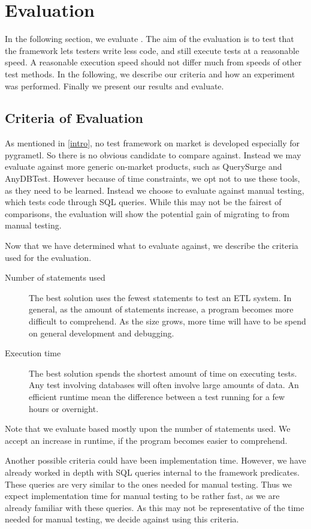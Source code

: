\section{Evaluation}\label{sect:eval}
In the following section, we evaluate \FW{}. The aim of the evaluation is to test that the framework lets testers write less code, and still execute tests at a reasonable speed. A reasonable execution speed should not differ much from speeds of other test methods.   In the following, we describe our criteria and how an experiment was performed. Finally we present our results and evaluate. 

\subsection{Criteria of Evaluation}\label{subsect:CoE}
As mentioned in \cref{intro}, no test framework on market is developed especially for pygrametl. So there is no obvious candidate to compare against. Instead we may evaluate against more generic on-market products, such as QuerySurge and AnyDBTest. However because of time constraints, we opt not to use these tools, as they need to be learned. Instead we choose to evaluate against manual testing, which tests code through SQL queries.  While this may not be the fairest of comparisons, the evaluation will show the potential gain of migrating to \FW{} from manual testing. 

Now that we have determined what to evaluate \FW{} against, we describe the criteria used for the evaluation.  

\begin{description}
\item[Number of statements used] The best solution uses the fewest statements to test an ETL system. In general, as the amount of statements increase, a program becomes more difficult to comprehend. As the size grows, more time will have to be spend on general development and debugging.
\item[Execution time] The best solution spends the shortest amount of time on executing tests. Any test involving databases will often involve large amounts of data. An efficient runtime mean the difference between a test running for a few hours or overnight. 
\end{description}

Note that we evaluate based mostly upon the number of statements used. We accept an increase in runtime, if the program becomes easier to comprehend.

Another possible criteria could have been implementation time. However, we have already worked in depth with SQL queries internal to the framework predicates. These queries are very similar to the ones needed for manual testing. Thus we expect implementation time for manual testing to be rather fast, as we are already familiar with these queries.  As this may not be representative of the time needed for manual testing, we decide against using this criteria.  

